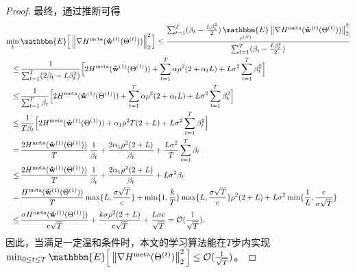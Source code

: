 \begin{proof}
最终，通过推断可得
\begin{equation}
    \begin{aligned}
        \mathop{\min}\limits_{t} & \, \mathbbm{E} \Big{[} \left\| \nabla H^{\rm meta}(\mathbf{\hat w}^{(t)}(\Theta^{(t)})) \right\|_2^2  \Big{]}  \leq
        \frac{\sum\nolimits_{t=1}^T (\beta_t - \frac{L \beta_t^2}{2}) \mathop{\mathbbm{E}}\limits_{\varepsilon^{(N)}} \left\| \nabla H^{\rm meta}(\mathbf{\hat w}^{(t)}(\Theta^{(t)})) \right\|_2^2 }{\sum\nolimits_{t=1}^T (\beta_t - \frac{L \beta_t^2}{2})}  \\
        \leq & \, \frac{1}{\sum\nolimits_{t=1}^T (2\beta_t - L\beta_t^2)} \Big{[}
        2H^{\rm meta}(\mathbf{\hat w}^{(1)}(\Theta^{(1)})) + \sum\limits_{t=1}^T \alpha \rho^2 (2 + \alpha_t L) + L\sigma^2 \sum\limits_{t=1}^T \beta_t^2
        \Big{]} \\
        \leq & \, \frac{1}{\sum\nolimits_{t=1}^T \beta_t}  \Big{[}
        2H^{\rm meta}(\mathbf{\hat w}^{(1)}(\Theta^{(1)})) + \sum\limits_{t=1}^T \alpha \rho^2 (2 + \alpha_t L) + L\sigma^2 \sum\limits_{t=1}^T \beta_t^2
        \Big{]} \\
        \leq & \, \frac{1}{T \beta_t} \Big{[}
        2H^{\rm meta}(\mathbf{\hat w}^{(1)}(\Theta^{(1)})) +  
        \alpha_1 \rho^2 T (2 +  L) + 
        L\sigma^2 \sum\limits_{t=1}^T \beta_t^2
        \Big{]} \\
        = & \, \frac{2H^{\rm meta}(\mathbf{\hat w}^{(1)}(\Theta^{(1)}))}{T} \, \frac{1}{\beta_t} + \frac{2  \alpha_1 \rho^2  (2 +  L)}{\beta_t}
        + \frac{L\sigma^2}{T} \sum\limits_{t=1}^T \beta_t \\
        \leq & \, \frac{2H^{\rm meta}(\mathbf{\hat w}^{(1)}(\Theta^{(1)}))}{T} \, \frac{1}{\beta_t} + \frac{2  \alpha_1 \rho^2  (2 +  L)}{\beta_t} + L\sigma^2  \beta_t \\
        = & \, \frac{H^{\rm meta}(\mathbf{\hat w}^{(1)}(\Theta^{(1)}))}{T} \max\{L, \frac{\sigma\sqrt{T}}{\rm c}\} + \min\{1, \frac{k}{T}\}\max\{L, \frac{\sigma\sqrt{T}}{\rm c}\}\rho^2(2+L) + L\sigma^2 \min\{\frac{1}{L}, \frac{\rm c}{\sigma\sqrt{T}}\} \\
        \leq & \, \frac{\sigma H^{\rm meta}(\mathbf{\hat w}^{(1)}(\Theta^{(1)}))}{{\rm c} \sqrt{T}} + \frac{k\sigma\rho^2(2+L)}{{\rm c} \sqrt{T}} + \frac{L\sigma{\rm c}}{\sqrt{T}} = \mathcal{O}(\frac{1}{\sqrt{T}}).
    \end{aligned}
\end{equation}
因此，当满足一定温和条件时，本文的学习算法能在$T$步内实现$\min_{0 \leq t \leq T} \mathbbm{E} \Big{[} \left\| \nabla H^{\rm meta}(\Theta^{(t)}) \right\|_2^2  \Big{]} \leq \mathcal{O}(\frac{1}{\sqrt{T}})$。

\end{proof}










